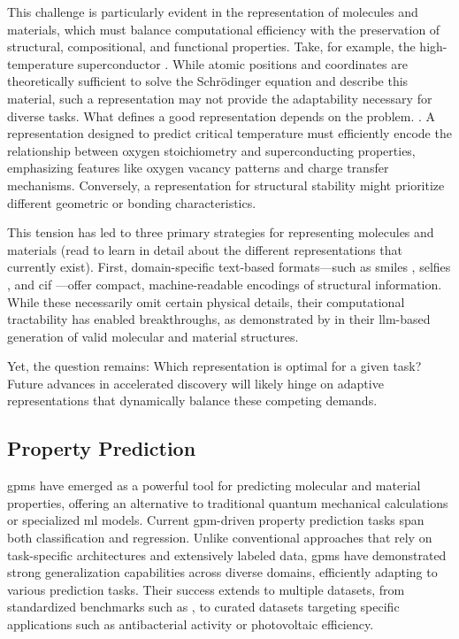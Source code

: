 This challenge is particularly evident in the representation of molecules and materials, which must balance computational efficiency with the preservation of structural, compositional, and functional properties. 
Take, for example, the high-temperature superconductor . 
While atomic positions and coordinates are theoretically sufficient to solve the Schrödinger equation and describe this material, such a representation may not provide the adaptability necessary for diverse tasks. What defines a good representation depends on the problem. \autocite{huang2016understanding}. 
A representation designed to predict critical temperature must efficiently encode the relationship between oxygen stoichiometry and superconducting properties, emphasizing features like oxygen vacancy patterns and charge transfer mechanisms. 
Conversely, a representation for structural stability might prioritize different geometric or bonding characteristics.

This tension has led to three primary strategies for representing molecules and materials (read  to learn in detail about the different representations that currently exist). 
First, domain-specific text-based formats---such as \gls{smiles} \autocite{weininger1988smiles}, \gls{selfies} \autocite{krenn2020self}, and \gls{cif} \autocite{hall1991crystallographic}---offer compact, machine-readable encodings of structural information. While these necessarily omit certain physical details, their computational tractability has enabled breakthroughs, as demonstrated by \textcite{jablonka2024leveraging} in their \gls{llm}-based generation of valid molecular and material structures.

Yet, the question remains: Which representation is optimal for a given task? Future advances in accelerated discovery will likely hinge on adaptive representations that dynamically balance these competing demands.

\subsection{Property Prediction} \label{sec:prediction}

\glspl{gpm} have emerged as a powerful tool for predicting molecular and material properties, offering an alternative to traditional quantum mechanical calculations or specialized \gls{ml} models. 
Current \gls{gpm}-driven property prediction tasks span both classification and regression. 
Unlike conventional approaches that rely on task-specific architectures and extensively labeled data, \glspl{gpm} have demonstrated strong generalization capabilities across diverse domains, efficiently adapting to various prediction tasks. 
Their success extends to multiple datasets, from standardized benchmarks such as  \autocite{wu2018moleculenet}, to curated datasets targeting specific applications such as antibacterial activity \autocite{chithrananda2020chemberta} or photovoltaic efficiency\autocite{aneesh2025semantic}.

